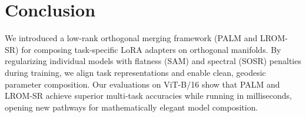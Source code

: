 \documentclass{article}
\theoremstyle{plain}
\theoremstyle{definition}
\theoremstyle{remark}
\begin{document}
\section{Conclusion}
\label{sec:conclusion}
We introduced a low-rank orthogonal merging framework (PALM and LROM-SR) for composing task-specific LoRA adapters on orthogonal manifolds. By regularizing individual models with flatness (SAM) and spectral (SOSR) penalties during training, we align task representations and enable clean, geodesic parameter composition. Our evaluations on ViT-B/16 show that PALM and LROM-SR achieve superior multi-task accuracies while running in milliseconds, opening new pathways for mathematically elegant model composition.

\nocite{*}

\clearpage


\end{document}
